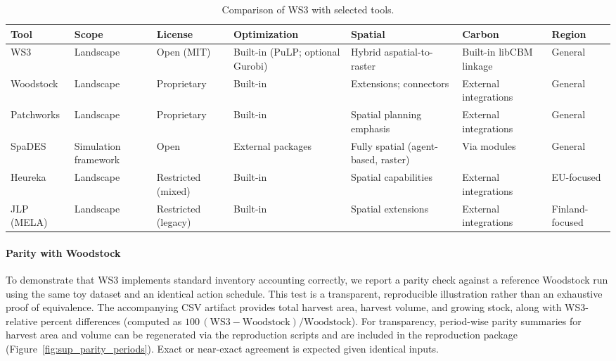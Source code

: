 \documentclass[review]{elsarticle}
\begin{document}
\begin{table}[h]
  \centering
  \caption{Comparison of WS3 with selected tools.}
  \begingroup
  \setlength{\tabcolsep}{3pt}
  \renewcommand{\arraystretch}{0.92}
  \footnotesize
  \begin{tabular}{p{2.4cm}p{2.1cm}p{1.5cm}p{2.0cm}p{2.0cm}p{1.9cm}p{1.9cm}}
  \toprule
  Tool & Scope & License & Optimization & Spatial & Carbon & Region \\
  \midrule
  WS3 & Landscape & Open (MIT) & Built-in (PuLP; optional Gurobi) & Hybrid aspatial-to-raster & Built-in libCBM linkage & General \\
  Woodstock & Landscape & Proprietary & Built-in & Extensions; connectors & External integrations & General \\
  Patchworks & Landscape & Proprietary & Built-in & Spatial planning emphasis & External integrations & General \\
  SpaDES & Simulation framework & Open & External packages & Fully spatial (agent-based, raster) & Via modules & General \\
  Heureka & Landscape & Restricted (mixed) & Built-in & Spatial capabilities & External integrations & EU-focused \\
  JLP (MELA) & Landscape & Restricted (legacy) & Built-in & Spatial extensions & External integrations & Finland-focused \\
  \bottomrule
  \end{tabular}
  \endgroup
\end{table}

\paragraph{Parity with Woodstock}
To demonstrate that WS3 implements standard inventory accounting correctly, we report a parity check against a reference Woodstock run using the same toy dataset and an identical action schedule. This test is a transparent, reproducible illustration rather than an exhaustive proof of equivalence. The accompanying CSV artifact  provides total harvest area, harvest volume, and growing stock, along with WS3-relative percent differences (computed as $100\,(\mathrm{WS3{-}Woodstock})/\mathrm{Woodstock}$). For transparency, period-wise parity summaries for harvest area and volume can be regenerated via the reproduction scripts and are included in the reproduction package (Figure~\ref{fig:sup_parity_periods}). Exact or near-exact agreement is expected given identical inputs.
\end{document}

